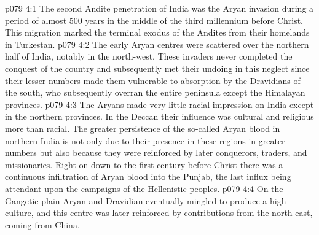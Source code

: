\vs p079 4:1 The second Andite penetration of India was the Aryan invasion during a period of almost 500 years in the middle of the third millennium before Christ. This migration marked the terminal exodus of the Andites from their homelands in Turkestan.
\vs p079 4:2 The early Aryan centres were scattered over the northern half of India, notably in the north\hyp{}west. These invaders never completed the conquest of the country and subsequently met their undoing in this neglect since their lesser numbers made them vulnerable to absorption by the Dravidians of the south, who subsequently overran the entire peninsula except the Himalayan provinces.
\vs p079 4:3 The Aryans made very little racial impression on India except in the northern provinces. In the Deccan their influence was cultural and religious more than racial. The greater persistence of the so\hyp{}called Aryan blood in northern India is not only due to their presence in these regions in greater numbers but also because they were reinforced by later conquerors, traders, and missionaries. Right on down to the first century before Christ there was a continuous infiltration of Aryan blood into the Punjab, the last influx being attendant upon the campaigns of the Hellenistic peoples.
\vs p079 4:4 On the Gangetic plain Aryan and Dravidian eventually mingled to produce a high culture, and this centre was later reinforced by contributions from the north\hyp{}east, coming from China.
